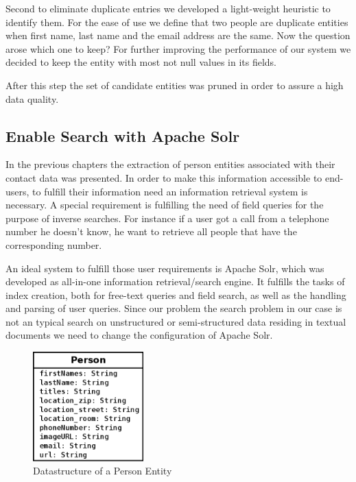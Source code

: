 \documentclass[11pt,titlepage,oneside,openany]{article}
\begin{document}
Second to eliminate duplicate entries we developed a light-weight heuristic to identify them. For the ease of use we define that two people are duplicate entities when first name, last name and the email address are the same. Now the question arose which one to keep? For further improving the performance of our system we decided to keep the entity with most not null values in its fields.

After this step the set of candidate entities was pruned in order to assure a high data quality.
\subsection{Enable Search with Apache Solr}

In the previous chapters the extraction of person entities associated with their contact data was presented. In order to make this information accessible to end-users, to fulfill their information need an information retrieval system is necessary. A special requirement is fulfilling the need of field queries for the purpose of inverse searches. For instance if a user got a call from a telephone number he doesn't know, he want to retrieve all people that have the corresponding number.

An ideal system to fulfill those user requirements is Apache Solr, which was developed as all-in-one information retrieval/search engine. It fulfills the tasks of index creation, both for free-text queries and field search, as well as the handling and parsing of user queries.  Since our problem the search problem in our case is not an typical search on unstructured or semi-structured data residing in textual documents we need to change the configuration of Apache Solr.

\begin{figure}
  \begin{center}
   \includegraphics[width=0.38\textwidth]{figures/Person.png}
  \end{center}
  \caption{Datastructure of a Person Entity}
    \label{fig:person}
\end{figure}
\end{document}
